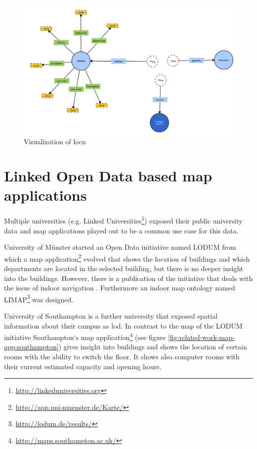 \documentclass[draft,final]{vutinfth} %
\begin{document}
\begin{figure}[h]
    \centering
    \includegraphics[width=1.0\textwidth]{graphics/vocabularies/locn.png}
    \caption{Visualization of \gls{locn}}
    \label{fig:related-work-geospatial-ontologies:locn}
\end{figure}


\section{Linked Open Data based map applications}
\label{related-work-map-app}

Multiple universities (e.g. Linked Universities\footnote{\url{http://linkeduniversities.org}}) exposed their public university data and map applications played out to be a common use case for this data.

University of Münster started an Open Data initiative named LODUM\cite{kesler_linked_2012} from which a map application\footnote{\url{http://app.uni-muenster.de/Karte/}} evolved that shows the location of buildings and which departments are located in the selected building, but there is no deeper insight into the buildings. However, there is a publication of the initiative that deals with the issue of indoor navigation \cite{kostic_automated_2015-1}. Furthermore an indoor map ontology named LIMAP\footnote{\url{http://lodum.de/results/}} was designed.

University of Southampton is a further university that exposed spatial information about their campus as \gls{lod}. In contrast to the map of the LODUM initiative Southampton`s map application\footnote{\url{http://maps.southampton.ac.uk/}} (see figure \ref{fig:related-work-map-app:southampton}) gives insight into buildings and shows the location of certain rooms with the ability to switch the floor. It shows also computer rooms with their current estimated capacity and opening hours.  
\end{document}

